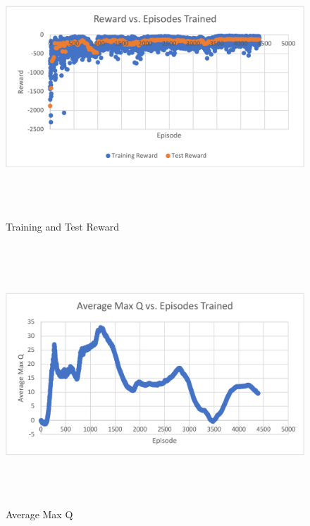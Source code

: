\begin{figure}[H]
	\includegraphics[width=6in, height=3.85in, keepaspectratio]{figures/train_figs/all_r.pdf}
	\caption{Training and Test Reward} \label{fig:all_r}
\end{figure}

\begin{figure}[H]
	\includegraphics[width=6in, height=3.85in, keepaspectratio]{figures/train_figs/all_q.pdf}
	\caption{Average Max Q} \label{fig:all_q}
\end{figure}

